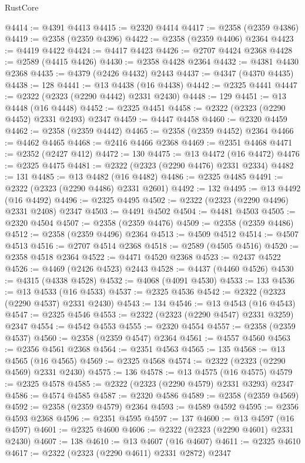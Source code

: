 \begin{lexlean}{RustCore}
\begin{coremodule}
@4414 := @4391 @4413
@4415 := @2320 @4414
@4417 := @2358 (@2359 @4386)
@4419 := @2358 (@2359 @4396)
@4422 := @2358 (@2359 @4406) @2364
@4423 := @4419 @4422
@4424 := @4417 @4423
@4426 := @2707 @4424 @2368
@4428 := @2589 (@4415 @4426)
@4430 := @2358 @4428 @2364
@4432 := @4381 @4430 @2368
@4435 := @4379 (@2426 @4432) @2443
@4437 := @4347 (@4370 @4435)
@4438 := 128
@4441 := @13 @4438 (@16 @4438)
@4442 := @2325 @4441
@4447 := @2322 (@2323 (@2290 @4442) @2331 @2430)
@4448 := 129
@4451 := @13 @4448 (@16 @4448)
@4452 := @2325 @4451
@4458 := @2322 (@2323 (@2290 @4452) @2331 @2493) @2347
@4459 := @4447 @4458
@4460 := @2320 @4459
@4462 := @2358 (@2359 @4442)
@4465 := @2358 (@2359 @4452) @2364
@4466 := @4462 @4465
@4468 := @2416 @4466 @2368
@4469 := @2351 @4468
@4471 := @2352 (@2427 @412)
@4472 := 130
@4475 := @13 @4472 (@16 @4472)
@4476 := @2325 @4475
@4481 := @2322 (@2323 (@2290 @4476) @2331 @2334)
@4482 := 131
@4485 := @13 @4482 (@16 @4482)
@4486 := @2325 @4485
@4491 := @2322 (@2323 (@2290 @4486) @2331 @2601)
@4492 := 132
@4495 := @13 @4492 (@16 @4492)
@4496 := @2325 @4495
@4502 := @2322 (@2323 (@2290 @4496) @2331 @2408) @2347
@4503 := @4491 @4502
@4504 := @4481 @4503
@4505 := @2320 @4504
@4507 := @2358 (@2359 @4476)
@4509 := @2358 (@2359 @4486)
@4512 := @2358 (@2359 @4496) @2364
@4513 := @4509 @4512
@4514 := @4507 @4513
@4516 := @2707 @4514 @2368
@4518 := @2589 (@4505 @4516)
@4520 := @2358 @4518 @2364
@4522 := @4471 @4520 @2368
@4523 := @2437 @4522
@4526 := @4469 (@2426 @4523) @2443
@4528 := @4437 (@4460 @4526)
@4530 := @4315 (@4338 @4528)
@4532 := @4068 (@4091 @4530)
@4533 := 133
@4536 := @13 @4533 (@16 @4533)
@4537 := @2325 @4536
@4542 := @2322 (@2323 (@2290 @4537) @2331 @2430)
@4543 := 134
@4546 := @13 @4543 (@16 @4543)
@4547 := @2325 @4546
@4553 := @2322 (@2323 (@2290 @4547) @2331 @3259) @2347
@4554 := @4542 @4553
@4555 := @2320 @4554
@4557 := @2358 (@2359 @4537)
@4560 := @2358 (@2359 @4547) @2364
@4561 := @4557 @4560
@4563 := @2356 @4561 @2368
@4564 := @2351 @4563
@4565 := 135
@4568 := @13 @4565 (@16 @4565)
@4569 := @2325 @4568
@4574 := @2322 (@2323 (@2290 @4569) @2331 @2430)
@4575 := 136
@4578 := @13 @4575 (@16 @4575)
@4579 := @2325 @4578
@4585 := @2322 (@2323 (@2290 @4579) @2331 @3293) @2347
@4586 := @4574 @4585
@4587 := @2320 @4586
@4589 := @2358 (@2359 @4569)
@4592 := @2358 (@2359 @4579) @2364
@4593 := @4589 @4592
@4595 := @2356 @4593 @2368
@4596 := @2351 @4595
@4597 := 137
@4600 := @13 @4597 (@16 @4597)
@4601 := @2325 @4600
@4606 := @2322 (@2323 (@2290 @4601) @2331 @2430)
@4607 := 138
@4610 := @13 @4607 (@16 @4607)
@4611 := @2325 @4610
@4617 := @2322 (@2323 (@2290 @4611) @2331 @2872) @2347

\end{coremodule}
\end{lexlean}
